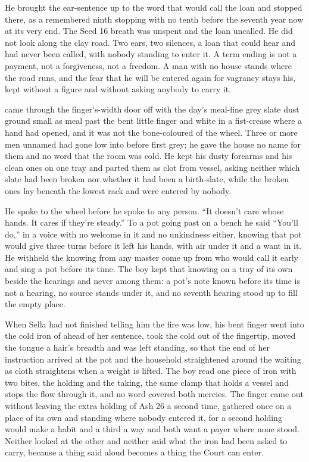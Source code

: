 He brought the ear-sentence up to the word that would call the loan and stopped there, as a remembered ninth stopping with no tenth before the seventh year now at its very end. The Seed 16 breath was unspent and the loan uncalled. He did not look along the clay road. Two ears, two silences, a loan that could hear and had never been called, with nobody standing to enter it. A term ending is not a payment, not a forgiveness, not a freedom. A man with no house stands where the road runs, and the fear that he will be entered again for vagrancy stays his, kept without a figure and without asking anybody to carry it.

\scenebreak

 came through the finger's-width door off  with the day's meal-fine grey slate dust ground small as meal past the bent little finger and white in a fist-crease where a hand had opened, and it was not the bone-coloured  of the wheel. Three or more men unnamed had gone low into  before first grey; he gave the house no name for them and no word that the room was cold. He kept his dusty forearms and his clean ones on one tray and parted them as clot from vessel, asking neither which slate had been broken nor whether it had been a birth-slate, while the broken ones lay beneath the lowest rack and were entered by nobody.

He spoke to the wheel before he spoke to any person. “It doesn't care whose hands. It cares if they're steady.” To a pot going past on a bench he said “You'll do,” in a voice with no welcome in it and no unkindness either, knowing  that pot would give three turns before it left his hands, with air under it and a want in it. He withheld the knowing from any master come up from  who would call it early and sing a pot before its time. The boy kept that knowing on a tray of its own beside the hearings and never among them: a pot's note known before its time is not a hearing, no source stands under it, and no seventh hearing stood up to fill the empty place.

When Sella had not finished telling him the fire was low, his bent finger went into the cold iron of  ahead of her sentence, took the cold out of the fingertip, moved the tongue a hair's breadth and was left standing, so that the end of her instruction arrived at the pot and the household straightened around the waiting as cloth straightens when a weight is lifted. The boy read one piece of iron with two bites, the holding and the taking, the same clamp that holds a vessel and stops the flow through it, and no  word covered both mercies. The finger came out without leaving the extra holding of Ash 26 a second time, gathered once on a place of its own and standing where nobody entered it, for a second holding would make a habit and a third a way and both want a payer where none stood. Neither looked at the other and neither said what the iron had been asked to carry, because a thing said aloud becomes a thing the Court can enter.

